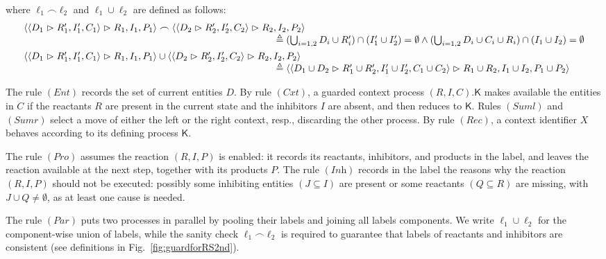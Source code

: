 \begin{figure*}[t]
\medskip	
\noindent
{\footnotesize
		where $\ell_1 \frown \ell_2$ and $\ell_1 \cup \ell_2$ are defined as follows:
		$$\begin{array}{l}
\langle \langle D_1\vartriangleright R'_1,I'_1,C_1\rangle\vartriangleright R_1,I_1,P_1\rangle
\frown
\langle \langle D_2\vartriangleright R'_2,I'_2,C_2\rangle\vartriangleright R_2,I_2,P_2\rangle
\\
\qquad\qquad\qquad\qquad\qquad\qquad\qquad\qquad\qquad\qquad\qquad\qquad\qquad
\triangleq (\textstyle\bigcup_{i=1,2} D_i\cup  R'_i) \cap (I'_1 \cup I'_2) = \emptyset
\wedge
(\bigcup_{i=1,2} D_i\cup  C_i\cup  R_i) \cap (I_1 \cup I_2) = \emptyset \\[5pt]
\langle \langle D_1\vartriangleright R'_1,I'_1,C_1\rangle\vartriangleright R_1,I_1,P_1\rangle
\cup
\langle \langle D_2\vartriangleright R'_2,I'_2,C_2\rangle\vartriangleright R_2,I_2,P_2\rangle
\\
\qquad\qquad\qquad\qquad\qquad\qquad\qquad\qquad\qquad\qquad\qquad\qquad\qquad
\triangleq \langle \langle D_1\cup D_2\vartriangleright R'_1\cup R'_2,I'_1\cup I'_2,C_1\cup C_2\rangle\vartriangleright R_1\cup R_2,I_1\cup I_2,P_1\cup P_2\rangle
\end{array}$$
}
		\caption{SOS semantics of the RS processes.}
		\label{fig:guardforRS2nd}
\end{figure*}


The rule $(\textit{Ent})$ records the set of current entities $D$.
By rule $(\textit{Cxt})$, a guarded context process $(R,I,C).\mathsf{K}$ makes available the entities in $C$ if the reactants $R$ are present in the current state and the inhibitors $I$ are absent, and then reduces to $\mathsf{K}$. 
Rules $(\textit{Suml})$ and $(\textit{Sumr})$ select a move of either the left or the right context, resp., discarding the other process.
By rule $(\textit{Rec})$, a context identifier $X$ behaves according to its defining process $\mathsf{K}$.

The rule $(\textit{Pro})$ assumes the reaction $(R,I,P)$ is enabled: it records its reactants, inhibitors, and products in the label, and leaves the reaction  available at the next step, together with its products $P$.
The rule $(\textit{Inh})$ records in the label the reasons why the reaction $(R,I,P)$ should not be executed: possibly some inhibiting entities $(J \subseteq I)$ are present or some reactants $(Q \subseteq R)$ are missing, with $J \cup Q \neq \emptyset$, as at least one cause is needed.

The rule $(\textit{Par})$ puts two processes in parallel by pooling their labels and joining all labels components. We write $\ell_1\cup\ell_2$ for the component-wise union of labels, while the sanity check $\ell_1\frown\ell_2$ is required to guarantee that labels of reactants and inhibitors are consistent (see definitions in Fig.~\ref{fig:guardforRS2nd}).

